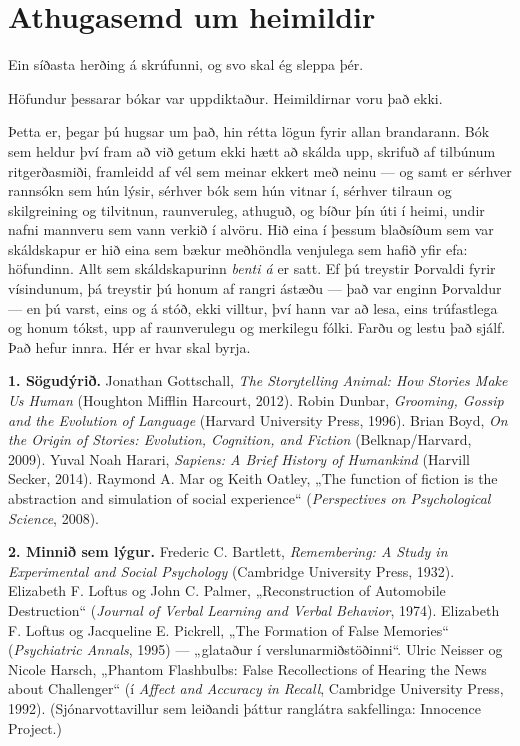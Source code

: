 \chapter*{Athugasemd um heimildir}
{} %
\label{sec:noteonsources}

Ein síðasta herðing á skrúfunni, og svo skal ég sleppa þér.

Höfundur þessarar bókar var uppdiktaður. Heimildirnar voru það ekki.

Þetta er, þegar þú hugsar um það, hin rétta lögun fyrir allan brandarann. Bók sem heldur því fram að við getum ekki hætt að skálda upp, skrifuð af tilbúnum ritgerðasmiði, framleidd af vél sem meinar ekkert með neinu — og samt er sérhver rannsókn sem hún lýsir, sérhver bók sem hún vitnar í, sérhver tilraun og skilgreining og tilvitnun, raunveruleg, athuguð, og bíður þín úti í heimi, undir nafni mannveru sem vann verkið í alvöru. Hið eina í þessum blaðsíðum sem var skáldskapur er hið eina sem bækur meðhöndla venjulega sem hafið yfir efa: höfundinn. Allt sem skáldskapurinn \emph{benti á} er satt. Ef þú treystir Þorvaldi fyrir vísindunum, þá treystir þú honum af rangri ástæðu — það var enginn Þorvaldur — en þú varst, eins og á stóð, ekki villtur, því hann var að lesa, eins trúfastlega og honum tókst, upp af raunverulegu og merkilegu fólki. Farðu og lestu það sjálf. Það hefur innra. Hér er hvar skal byrja.

\textbf{1. Sögudýrið.} Jonathan Gottschall, \emph{The Storytelling Animal: How Stories Make Us Human} (Houghton Mifflin Harcourt, 2012). Robin Dunbar, \emph{Grooming, Gossip and the Evolution of Language} (Harvard University Press, 1996). Brian Boyd, \emph{On the Origin of Stories: Evolution, Cognition, and Fiction} (Belknap/Harvard, 2009). Yuval Noah Harari, \emph{Sapiens: A Brief History of Humankind} (Harvill Secker, 2014). Raymond A. Mar og Keith Oatley, „The function of fiction is the abstraction and simulation of social experience“ (\emph{Perspectives on Psychological Science}, 2008).

\textbf{2. Minnið sem lýgur.} Frederic C. Bartlett, \emph{Remembering: A Study in Experimental and Social Psychology} (Cambridge University Press, 1932). Elizabeth F. Loftus og John C. Palmer, „Reconstruction of Automobile Destruction“ (\emph{Journal of Verbal Learning and Verbal Behavior}, 1974). Elizabeth F. Loftus og Jacqueline E. Pickrell, „The Formation of False Memories“ (\emph{Psychiatric Annals}, 1995) — „glataður í verslunarmiðstöðinni“. Ulric Neisser og Nicole Harsch, „Phantom Flashbulbs: False Recollections of Hearing the News about Challenger“ (í \emph{Affect and Accuracy in Recall}, Cambridge University Press, 1992). (Sjónarvottavillur sem leiðandi þáttur ranglátra sakfellinga: Innocence Project.)

